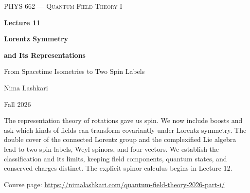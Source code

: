 \documentclass[11pt]{article}
\begin{document}
\begin{titlepage}
\centering
\vspace*{1.2in}
{\scshape\Large PHYS 662 --- Quantum Field Theory I\par}
\vspace{0.35in}
{\Huge\bfseries\color{qftblue} Lecture 11\par}
\vspace{0.15in}
{\LARGE\bfseries Lorentz Symmetry\par}
\vspace{0.06in}
{\LARGE\bfseries and Its Representations\par}
\vspace{0.16in}
{\large\color{qftgreen} From Spacetime Isometries to Two Spin Labels\par}
\vspace{0.6in}
{\large Nima Lashkari\par}
{\large Fall 2026\par}
\vfill
\begin{minipage}{0.86\textwidth}
\small
The representation theory of rotations gave us spin. We now include
boosts and ask which kinds of fields can transform covariantly under
Lorentz symmetry. The double cover of the connected Lorentz group and
the complexified Lie algebra lead to two spin labels, Weyl spinors,
and four-vectors. We establish the classification and its limits,
keeping field components, quantum states, and conserved charges distinct.
The explicit spinor calculus begins in Lecture 12.

\medskip
Course page: \url{https://nimalashkari.com/quantum-field-theory-2026-part-i/}
\end{minipage}
\vspace{0.5in}
\end{titlepage}
\begingroup\small
\tableofcontents
\endgroup
\newpage
{}
\end{document}
